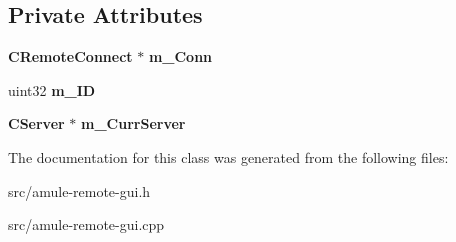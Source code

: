 \subsection*{Private Attributes}
\begin{DoxyCompactItemize}
\item 
{\bf CRemoteConnect} $\ast$ {\bfseries m\_\-Conn}\label{classCServerConnectRem_a28337fe2c83331acc6ec79bb0b9b8cec}

\item 
uint32 {\bfseries m\_\-ID}\label{classCServerConnectRem_acc65f613c12fc1621873fef03299774a}

\item 
{\bf CServer} $\ast$ {\bfseries m\_\-CurrServer}\label{classCServerConnectRem_af1401d3bc53ee1f584f4626943071262}

\end{DoxyCompactItemize}


The documentation for this class was generated from the following files:\begin{DoxyCompactItemize}
\item 
src/amule-\/remote-\/gui.h\item 
src/amule-\/remote-\/gui.cpp\end{DoxyCompactItemize}
